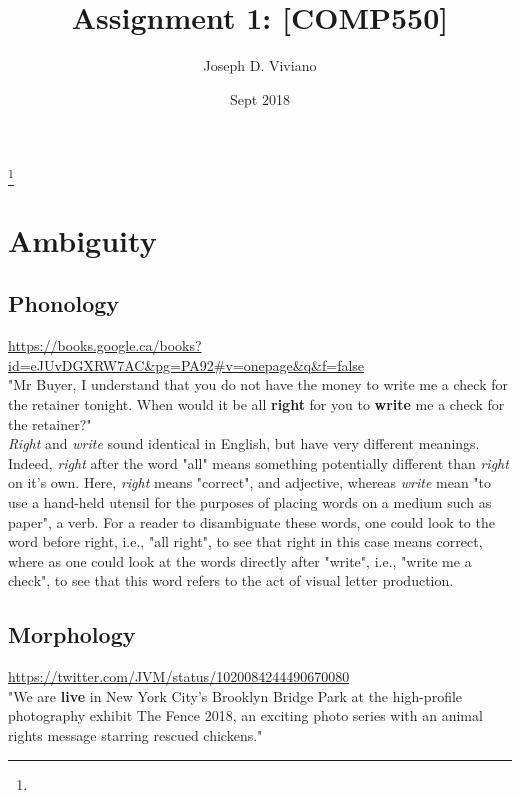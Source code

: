 \documentclass{amsart}
\theoremstyle{definition}
\theoremstyle{remark}
\numberwithin{equation}{section}
\begin{document}
\title{Assignment 1: [COMP550]}

\author{Joseph D. Viviano}
\address{McGill University}
\curraddr{}
\thanks{}
\date{Sept 2018}

\maketitle

\section{Ambiguity}

\subsection{Phonology}

\url{https://books.google.ca/books?id=eJUvDGXRW7AC&pg=PA92#v=onepage&q&f=false} \\

"Mr Buyer, I understand that you do not have the money to write me a check for the retainer tonight. When would it be all \textbf{right} for you to \textbf{write} me a check for the retainer?" \\

\textit{Right} and \textit{write} sound identical in English, but have very different meanings. Indeed, \textit{right} after the word "all" means something potentially different than \textit{right} on it's own. Here, \textit{right} means "correct", and adjective, whereas \textit{write} mean "to use a hand-held utensil for the purposes of placing words on a medium such as paper", a verb. For a reader to disambiguate these words, one could look to the word before right, i.e., "all right", to see that right in this case means correct, where as one could look at the words directly after "write", i.e., "write me a check", to see that this word refers to the act of visual letter production. \\

\subsection{Morphology}

\url{https://twitter.com/JVM/status/1020084244490670080} \\

"We are \textbf{live} in New York City’s Brooklyn Bridge Park at the high-profile photography exhibit The Fence 2018, an exciting photo series with an animal rights message starring rescued chickens." \\
\end{document}
